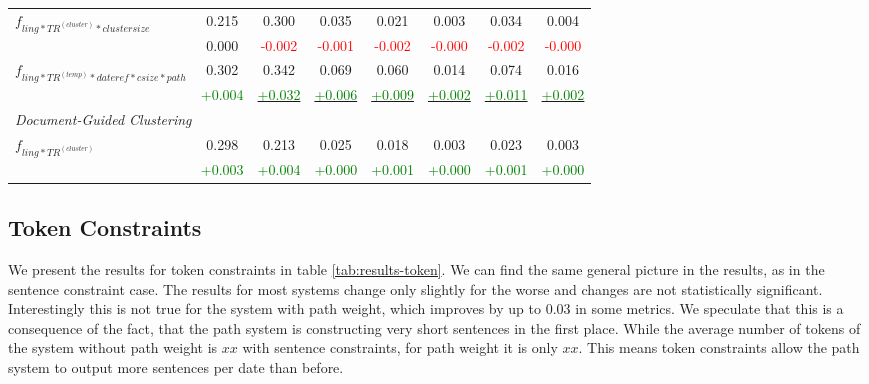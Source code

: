 \documentclass[a4paper,BCOR=10mm]{report}
\numberwithin{lemma}{chapter}
\numberwithin{definition}{chapter}
\begin{document}
\begin{table}
\begin{centering}
{\begin{tabular}{|l|ccccccc|}
\multirow{2}{*}{$f_{ \mathit{ling}*TR^{(cluster)}*\mathit{cluster size} }$} & 0.215 & 0.300 & 0.035 & 0.021 & 0.003 & 0.034 & 0.004 \\
    & 0.000 & \small \textcolor{red}{-0.002}    & \small \textcolor{red}{-0.001}    & \small \textcolor{red}{-0.002}    & \small \textcolor{red}{-0.000}    & \small \textcolor{red}{-0.002}    & \small \textcolor{red}{-0.000} \\\hline
\multirow{2}{*}{$f_{ ling*TR^{(temp)}*\mathit{dateref}*\mathit{csize}*\mathit{path} }$}   & 0.302 & 0.342 & 0.069 & 0.060 & 0.014 & 0.074 & 0.016 \\
    & \small \textcolor{green}{+0.004}  & \underline{\small \textcolor{green}{+0.032}}  & \underline{\small \textcolor{green}{+0.006}}  & \underline{\small \textcolor{green}{+0.009}}  & \underline{\small \textcolor{green}{+0.002}}  & \underline{\small \textcolor{green}{+0.011}}  & \underline{\small \textcolor{green}{+0.002}} \\\hline
\multicolumn{ 8 }{|l|}{ \textit{ Document-Guided Clustering } }\\\hline
\multirow{2}{*}{$f_{ \mathit{ling}*TR^{(cluster)} }$} & 0.298 & 0.213 & 0.025 & 0.018 & 0.003 & 0.023 & 0.003 \\
    & \small \textcolor{green}{+0.003}  & \small \textcolor{green}{+0.004}  & \small \textcolor{green}{+0.000}  & \small \textcolor{green}{+0.001}  & \small \textcolor{green}{+0.000}  & \small \textcolor{green}{+0.001}  & \small \textcolor{green}{+0.000} \\\hline
    \end{tabular}
}
\end{centering}
\end{table}


\subsection{Token Constraints}

We present the results for token constraints in table \ref{tab:results-token}.
We can find the same general picture in the results, as in the sentence constraint case.
The results for most systems change only slightly for the worse and changes are not statistically significant.
Interestingly this is not true for the system with path weight, which improves by up to $0.03$ in some metrics.
We speculate that this is a consequence of the fact, that the path system is constructing very short sentences in the first place.
While the average number of tokens of the system without path weight is $xx$ with sentence constraints, for path weight it is only $xx$.
This means token constraints allow the path system to output more sentences per date than before.
\end{document}

